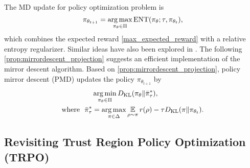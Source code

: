 The MD update for policy optimization problem is 
\begin{equation}
\pi_{\theta_{t+1}} = \operatorname*{arg\,max}\limits_{\pi_\theta \in \Pi}  \text{ENT}(\pi_\theta; \tau, \pi_{\theta_t}), 
\end{equation}
which combines the expected reward \cref{max_expected_reward} with a relative entropy regularizer. Similar ideas have also been explored in \citet{peters2007reinforcement,wierstra2008episodic,peters2010relative,schulman2015trust,montgomery2016guided,nachum2017trust,haarnoja2018soft,abdolmaleki2018maximum}. The following \cref{prop:mirrordescent_projection} suggests an efficient implementation of the mirror descent algorithm.
Based on \cref{prop:mirrordescent_projection}, policy mirror descent (PMD) updates the policy $\pi_{\theta_{t+1}}$ by
\begin{equation}
\begin{split}
&\operatorname*{arg\,min}\limits_{\pi_\theta \in \Pi}{D_{\mathrm{KL}}( \pi_\theta \| \bar{\pi}_{\tau}^* )}, \\
\text{where}\ \ \bar{\pi}_{\tau}^* & =  \operatorname*{arg\,max}\limits_{\pi \in \Delta}{ \operatorname*{\mathbb{E}}\limits_{\rho \sim \pi}{  r(\rho)  - \tau D_{\mathrm{KL}}(\pi \| \pi_{\theta_t}) } }.
\end{split}
\end{equation}
\fi

\subsection{Revisiting Trust Region Policy Optimization (TRPO)}
\label{subsec:revisitTRPO}

